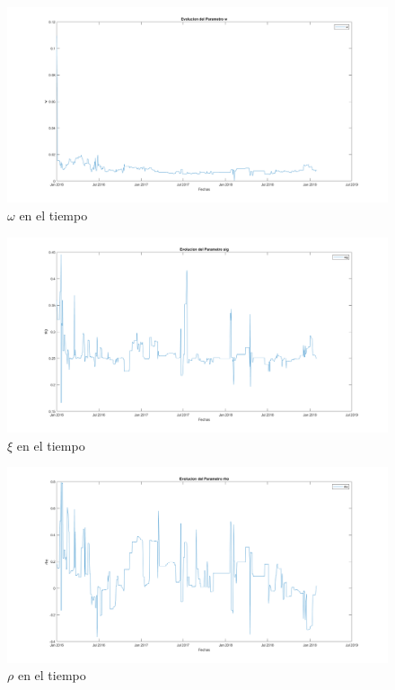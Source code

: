 \begin{figure}[H]
    \begin{center}
    \includegraphics[width = 14cm]{figures/Evoluciondew.png}
    \caption{$\omega$ en el tiempo}
    \label{omega} %
    \end{center}
\end{figure}
\begin{figure}[H]
    \begin{center}
    \includegraphics[width = 14cm]{figures/Evoluciondesig.png}
    \caption{$\xi$ en el tiempo}
    \label{xi} %
    \end{center}
\end{figure}
\begin{figure}[H]
    \begin{center}
    \includegraphics[width = 14cm]{figures/Evolucionderho.png}
    \caption{$\rho$ en el tiempo}
    \label{rho} %
    \end{center}
\end{figure}

